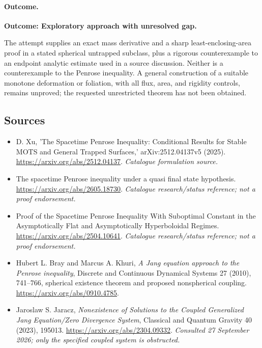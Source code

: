 \documentclass[11pt,a4paper]{article}
\numberwithin{equation}{section}
\begin{document}
\paragraph{Outcome.}
\textbf{Outcome: Exploratory approach with unresolved gap.}

The attempt supplies an exact mass derivative and a sharp least-enclosing-area
proof in a stated spherical untrapped subclass, plus a rigorous counterexample
to an endpoint analytic estimate used in a source discussion. Neither is a
counterexample to the Penrose inequality. A general construction of a suitable
monotone deformation or foliation, with all flux, area, and rigidity controls,
remains unproved; the requested unrestricted theorem has not been obtained.


\subsection{Sources}
\begin{itemize}\raggedright
\item[\textnormal{[S1]}]\hypertarget{source:30006689:1}{} D. Xu, 'The Spacetime Penrose Inequality: Conditional Results for Stable MOTS and General Trapped Surfaces,' arXiv:2512.04137v5 (2025).
\url{https://arxiv.org/abs/2512.04137}.
{\small\textit{Catalogue formulation source.}}
\item[\textnormal{[S2]}]\hypertarget{source:30006689:2}{} The spacetime Penrose inequality under a quasi final state hypothesis.
\url{https://arxiv.org/abs/2605.18730}.
{\small\textit{Catalogue research/status reference; not a proof endorsement.}}
\item[\textnormal{[S3]}]\hypertarget{source:30006689:3}{} Proof of the Spacetime Penrose Inequality With Suboptimal Constant in the Asymptotically Flat and Asymptotically Hyperboloidal Regimes.
\url{https://arxiv.org/abs/2504.10641}.
{\small\textit{Catalogue research/status reference; not a proof endorsement.}}
\item[\textnormal{[E1]}]\hypertarget{extra:30006689:1}{} Hubert L. Bray and Marcus A. Khuri,
\emph{A Jang equation approach to the Penrose inequality}, Discrete and Continuous
Dynamical Systems 27 (2010), 741--766, spherical existence theorem and proposed nonspherical coupling.
\url{https://arxiv.org/abs/0910.4785}.
\item[\textnormal{[E2]}]\hypertarget{extra:30006689:2}{} Jaroslaw S. Jaracz,
\emph{Nonexistence of Solutions to the Coupled Generalized Jang Equation/Zero Divergence System}, Classical and Quantum Gravity 40 (2023), 195013.
\url{https://arxiv.org/abs/2304.09332}.
{\small\textit{Consulted 27 September 2026; only the specified coupled system is obstructed.}}

\end{itemize}

\end{document}
